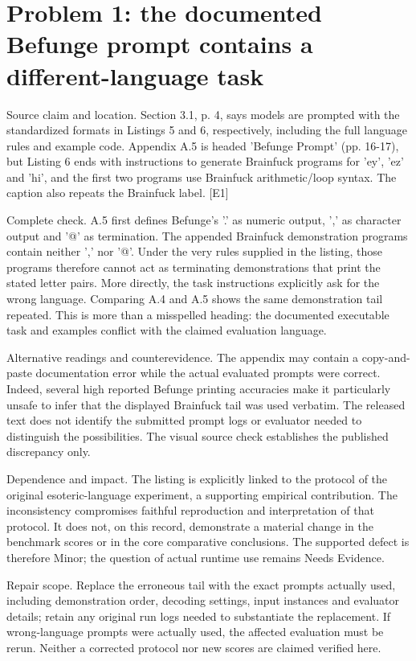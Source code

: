 \documentclass[10pt]{article}
\begin{document}
\section*{Problem 1: the documented Befunge prompt contains a different-language task}
Source claim and location. Section 3.1, p. 4, says models are prompted with the standardized formats in Listings 5 and 6, respectively, including the full language rules and example code. Appendix A.5 is headed ’Befunge Prompt’ (pp. 16-17), but Listing 6 ends with instructions to generate Brainfuck programs for ’ey’, ’ez’ and ’hi’, and the first two programs use Brainfuck arithmetic/loop syntax. The caption also repeats the Brainfuck label. [E1]\par
Complete check. A.5 first defines Befunge’s ’.’ as numeric output, ’,’ as character output and ’@’ as termination. The appended Brainfuck demonstration programs contain neither ’,’ nor ’@’. Under the very rules supplied in the listing, those programs therefore cannot act as terminating demonstrations that print the stated letter pairs. More directly, the task instructions explicitly ask for the wrong language. Comparing A.4 and A.5 shows the same demonstration tail repeated. This is more than a misspelled heading: the documented executable task and examples conflict with the claimed evaluation language.\par
Alternative readings and counterevidence. The appendix may contain a copy-and-paste documentation error while the actual evaluated prompts were correct. Indeed, several high reported Befunge printing accuracies make it particularly unsafe to infer that the displayed Brainfuck tail was used verbatim. The released text does not identify the submitted prompt logs or evaluator needed to distinguish the possibilities. The visual source check establishes the published discrepancy only.\par
Dependence and impact. The listing is explicitly linked to the protocol of the original esoteric-language experiment, a supporting empirical contribution. The inconsistency compromises faithful reproduction and interpretation of that protocol. It does not, on this record, demonstrate a material change in the benchmark scores or in the core comparative conclusions. The supported defect is therefore Minor; the question of actual runtime use remains Needs Evidence.\par
Repair scope. Replace the erroneous tail with the exact prompts actually used, including demonstration order, decoding settings, input instances and evaluator details; retain any original run logs needed to substantiate the replacement. If wrong-language prompts were actually used, the affected evaluation must be rerun. Neither a corrected protocol nor new scores are claimed verified here.\par
\end{document}
